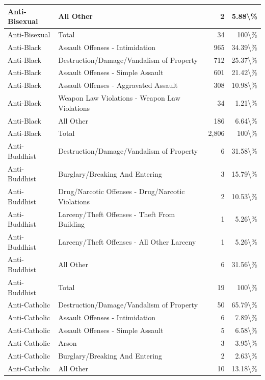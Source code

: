 \documentclass[
]{krantz}
\begin{document}
\begin{longtable}[t]{l|l|r|r}
\hline
Anti-Bisexual & All Other & 2 & 5.88\textbackslash{}\%\\
\hline
Anti-Bisexual & Total & 34 & 100\textbackslash{}\%\\
\hline
Anti-Black & Assault Offenses - Intimidation & 965 & 34.39\textbackslash{}\%\\
\hline
Anti-Black & Destruction/Damage/Vandalism of Property & 712 & 25.37\textbackslash{}\%\\
\hline
Anti-Black & Assault Offenses - Simple Assault & 601 & 21.42\textbackslash{}\%\\
\hline
Anti-Black & Assault Offenses - Aggravated Assault & 308 & 10.98\textbackslash{}\%\\
\hline
Anti-Black & Weapon Law Violations - Weapon Law Violations & 34 & 1.21\textbackslash{}\%\\
\hline
Anti-Black & All Other & 186 & 6.64\textbackslash{}\%\\
\hline
Anti-Black & Total & 2,806 & 100\textbackslash{}\%\\
\hline
Anti-Buddhist & Destruction/Damage/Vandalism of Property & 6 & 31.58\textbackslash{}\%\\
\hline
Anti-Buddhist & Burglary/Breaking And Entering & 3 & 15.79\textbackslash{}\%\\
\hline
Anti-Buddhist & Drug/Narcotic Offenses - Drug/Narcotic Violations & 2 & 10.53\textbackslash{}\%\\
\hline
Anti-Buddhist & Larceny/Theft Offenses - Theft From Building & 1 & 5.26\textbackslash{}\%\\
\hline
Anti-Buddhist & Larceny/Theft Offenses - All Other Larceny & 1 & 5.26\textbackslash{}\%\\
\hline
Anti-Buddhist & All Other & 6 & 31.56\textbackslash{}\%\\
\hline
Anti-Buddhist & Total & 19 & 100\textbackslash{}\%\\
\hline
Anti-Catholic & Destruction/Damage/Vandalism of Property & 50 & 65.79\textbackslash{}\%\\
\hline
Anti-Catholic & Assault Offenses - Intimidation & 6 & 7.89\textbackslash{}\%\\
\hline
Anti-Catholic & Assault Offenses - Simple Assault & 5 & 6.58\textbackslash{}\%\\
\hline
Anti-Catholic & Arson & 3 & 3.95\textbackslash{}\%\\
\hline
Anti-Catholic & Burglary/Breaking And Entering & 2 & 2.63\textbackslash{}\%\\
\hline
Anti-Catholic & All Other & 10 & 13.18\textbackslash{}\%\\

\end{longtable}
\end{document}
